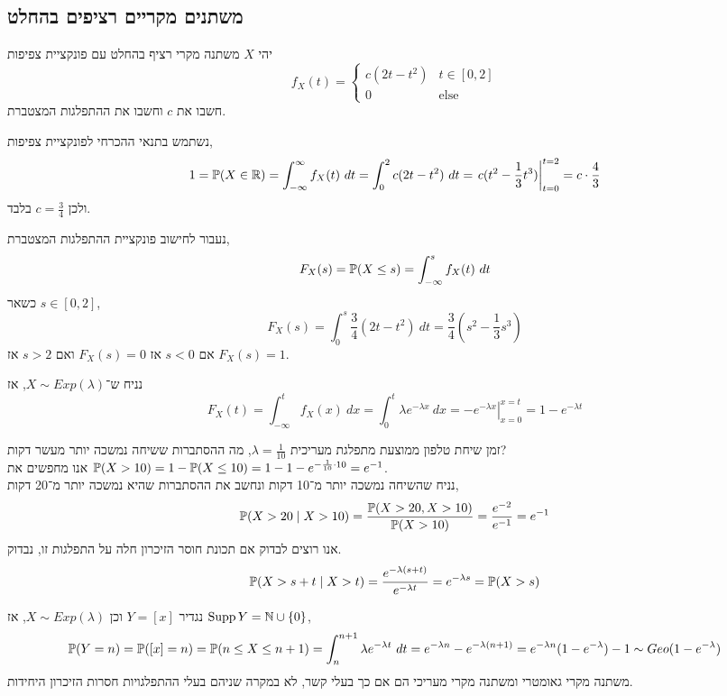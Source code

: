 \subsection{משתנים מקריים רציפים בהחלט}
\begin{exercise}
	יהי $X$ משתנה מקרי רציף בהחלט עם פונקציית צפיפות
	\[
		f_X(t) = \begin{cases}
			c(2t - t^2) & t \in [0, 2] \\
			0 & \text{else}
		\end{cases}
	\]
	חשבו את $c$ וחשבו את ההתפלגות המצטברת.
\end{exercise}
\begin{solution}
	נשתמש בתנאי ההכרחי לפונקציית צפיפות,
	\[
		1
		= \mathbb{P}(X \in \mathbb{R})
		= \int_{-\infty}^{\infty} f_X(t)\ dt
		= \int_{0}^{2} c (2t - t^2)\ dt
		= \left. c (t^2 - \frac{1}{3} t^3) \right\rvert_{t = 0}^{t = 2}
		= c \cdot \frac{4}{3}
	\]
	ולכן $c = \frac{3}{4}$ בלבד.
	
	נעבור לחישוב פונקציית ההתפלגות המצטברת,
	\[
		F_X(s)
		= \mathbb{P}(X \le s)
		= \int_{-\infty}^{s} f_X(t)\ dt
	\]
	כשאר $s \in [0, 2]$,
	\[
		F_X(s)
		= \int_{0}^{s} \frac{3}{4} (2t - t^2)\ dt
		= \frac{3}{4} (s^2 - \frac{1}{3} s^3)
	\]
	אם $s < 0$ אז $F_X(s) = 0$ ואם $s > 2$ אז $F_X(s) = 1$.
\end{solution}
\begin{example}
	נניח ש־$X \sim Exp(\lambda)$, אז
	\[
		F_X(t)
		= \int_{-\infty}^{t} f_X(x)\ dx
		= \int_{0}^{t} \lambda e^{-\lambda x}\ dx
		= \left. -e^{-\lambda x} \right\rvert_{x = 0}^{x = t}
		= 1 - e^{-\lambda t}
	\]
\end{example}
\begin{example}
	זמן שיחת טלפון ממוצעת מתפלגת מעריכית $\lambda = \frac{1}{10}$, מה ההסתברות ששיחה נמשכה יותר מעשר דקות? \\
	אנו מחפשים את $\mathbb{P}(X > 10) = 1 - \mathbb{P}(X \le 10) = 1 - 1 - e^{-\frac{1}{10} \cdot 10} = e^{-1}$. \\
	נניח שהשיחה נמשכה יותר מ־10 דקות ונחשב את ההסתברות שהיא נמשכה יותר מ־20 דקות,
	\[
		\mathbb{P}(X > 20 \mid X > 10)
		= \frac{\mathbb{P}(X > 20, X > 10)}{\mathbb{P}(X > 10)}
		= \frac{e^{-2}}{e^{-1}}
		= e^{-1}
	\]
	אנו רוצים לבדוק אם תכונת חוסר הזיכרון חלה על התפלגות זו, נבדוק.
	\[
		\mathbb{P}(X > s + t \mid X > t)
		= \frac{e^{-\lambda(s + t)}}{e^{-\lambda t}}
		= e^{-\lambda s}
		= \mathbb{P}(X > s)
	\]
\end{example}
\begin{example}
	נגדיר $Y = [x]$ וכן $X \sim Exp(\lambda)$, אז $\operatorname{Supp} Y = \mathbb{N} \cup \{ 0 \}$,
	\[
		\mathbb{P}(Y = n)
		= \mathbb{P}([x] = n)
		= \mathbb{P}(n \le X \le n + 1)
		= \int_{n}^{n + 1} \lambda e^{-\lambda t}\ dt
		= e^{-\lambda n} - e^{-\lambda (n + 1)}
		= e^{-\lambda n} (1 - e^{-\lambda}) - 1
		\sim Geo(1 - e^{-\lambda})
	\]
	משתנה מקרי גאומטרי ומשתנה מקרי מעריכי הם אם כך בעלי קשר, לא במקרה שניהם בעלי ההתפלגויות חסרות הזיכרון היחידות.
\end{example}

